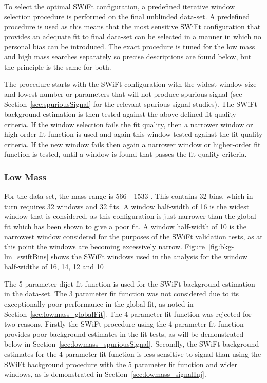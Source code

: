 To select the optimal SWiFt configuration, a predefined iterative window selection procedure is performed on the final unblinded data-set.
A predefined procedure is used as this means that the most sensitive SWiFt configuration that provides an adequate fit to final data-set can be selected
in a manner in which no personal bias can be introduced.
The exact procedure is tuned for the low mass and high mass searches separately so precise descriptions are found below,
but the principle is the same for both.

The procedure starts with the SWiFt configuration with the widest window size and lowest number or parameters that will not produce spurious signal
(see Section~\ref{sec:spuriousSignal} for the relevant spurious signal studies).
The SWiFt background estimation is then tested against the above defined fit quality criteria.
If the window selection fails the fit quality, then a narrower window or high-order fit function is used and again this window tested against the fit quality criteria.
If the new window fails then again a narrower window or higher-order fit function is tested, until a window is found that passes the fit quality criteria.


\subsubsection{Low Mass}
\label{sec:lowmass_windowSel}

For the \lm{} data-set, the mass range is 566 - 1533 \GeV{}. This contains 32 bins, which in turn requires 32 windows and 32 fits.
A window half-width of 16 is  the widest window that is considered,
as this configuration is just narrower than the global fit which has been shown to give a poor fit.
A window half-width of 10 is the narrowest window considered for the purposes of the SWiFt validation tests,
as at this point the windows are becoming excessively narrow.
Figure~\ref{fig:bkg-lm_swiftBins} shows the SWiFt windows used in the \lm{} analysis for the window half-widths of 16, 14, 12 and 10

The 5 parameter dijet fit function is used for the SWiFt background estimation in the \lm{} data-set.
The 3 parameter fit function was not considered due to its exceptionally poor performance in the global fit, as noted in Section~\ref{sec:lowmass_globalFit}.
The 4 parameter fit function was rejected for two reasons.
Firstly the SWiFt procedure using the 4 parameter fit function provides poor background estimates in the fit tests,
as will be demonstrated below in Section~\ref{sec:lowmass_spuriousSignal}.
Secondly, the SWiFt background estimates for the 4 parameter fit function is less sensitive to signal than
using the SWiFt background procedure with the 5 parameter fit function and wider windows, as is demonstrated in Section~\ref{sec:lowmass_signalInj}.

